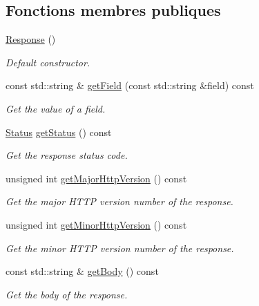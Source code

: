 \subsection*{Fonctions membres publiques}
\begin{DoxyCompactItemize}
\item 
\hyperlink{classsf_1_1Http_1_1Response_a2e51c89356fe6a007c448a841a9ec08c}{Response} ()
\begin{DoxyCompactList}\small\item\em Default constructor. \end{DoxyCompactList}\item 
const std\+::string \& \hyperlink{classsf_1_1Http_1_1Response_a6dedeaeea13b5ebf0c41fc7a1c1885e5}{get\+Field} (const std\+::string \&field) const
\begin{DoxyCompactList}\small\item\em Get the value of a field. \end{DoxyCompactList}\item 
\hyperlink{classsf_1_1Http_1_1Response_a663e071978e30fbbeb20ed045be874d8}{Status} \hyperlink{classsf_1_1Http_1_1Response_a4271651703764fd9a7d2c0315aff20de}{get\+Status} () const
\begin{DoxyCompactList}\small\item\em Get the response status code. \end{DoxyCompactList}\item 
unsigned int \hyperlink{classsf_1_1Http_1_1Response_ab1c6948f6444fad34d0537e206e398b8}{get\+Major\+Http\+Version} () const
\begin{DoxyCompactList}\small\item\em Get the major H\+T\+TP version number of the response. \end{DoxyCompactList}\item 
unsigned int \hyperlink{classsf_1_1Http_1_1Response_af3c649568d2e291e71c3a7da546bb392}{get\+Minor\+Http\+Version} () const
\begin{DoxyCompactList}\small\item\em Get the minor H\+T\+TP version number of the response. \end{DoxyCompactList}\item 
const std\+::string \& \hyperlink{classsf_1_1Http_1_1Response_ab3bfc29867563aa815f6460eeea16136}{get\+Body} () const
\begin{DoxyCompactList}\small\item\em Get the body of the response. \end{DoxyCompactList}\end{DoxyCompactItemize}
